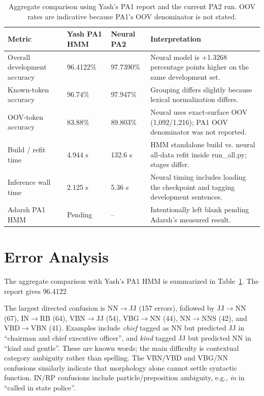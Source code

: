 \documentclass[11pt]{article}
\begin{document}
\begin{table}[t]
\centering\small
\begin{tabular}{p{3.1cm}p{2.4cm}p{2.4cm}p{6.7cm}}
\toprule
Metric & Yash PA1 HMM & Neural PA2 & Interpretation\\
\midrule
Overall development accuracy & 96.4122\% & 97.7390\% & Neural model is +1.3268 percentage points higher on the same development set.\\
Known-token accuracy & 96.74\% & 97.947\% & Grouping differs slightly because lexical normalization differs.\\
OOV-token accuracy & 83.88\% & 89.803\% & Neural uses exact-surface OOV (1,092/1,216); PA1 OOV denominator was not reported.\\
Build / refit time & 4.944 s & 132.6 s & HMM standalone build vs. neural all-data refit inside run\_all.py; stages differ.\\
Inference wall time & 2.125 s & 5.36 s & Neural timing includes loading the checkpoint and tagging development sentences.\\
Adarsh PA1 HMM & Pending & -- & Intentionally left blank pending Adarsh's measured result.\\
\bottomrule
\end{tabular}
\caption{Aggregate comparison using Yash's PA1 report and the current PA2 run. OOV rates are indicative because PA1's OOV denominator is not stated.}
\label{tab:hmmcomp}
\end{table}

\section{Error Analysis}
The aggregate comparison with Yash's PA1 HMM is summarized in Table~\ref{tab:hmmcomp}. The report gives 96.4122%

The largest directed confusion is NN$\rightarrow$JJ (157 errors), followed by JJ$\rightarrow$NN (67), IN$\rightarrow$RB (64), VBN$\rightarrow$JJ (54), VBG$\rightarrow$NN (44), NN$\rightarrow$NNS (42), and VBD$\rightarrow$VBN (41). Examples include \emph{chief} tagged as NN but predicted JJ in ``chairman and chief executive officer'', and \emph{kind} tagged JJ but predicted NN in ``kind and gentle''. These are known words; the main difficulty is contextual category ambiguity rather than spelling. The VBN/VBD and VBG/NN confusions similarly indicate that morphology alone cannot settle syntactic function. IN/RP confusions include particle/preposition ambiguity, e.g., \emph{in} in ``called in state police''.
\end{document}
